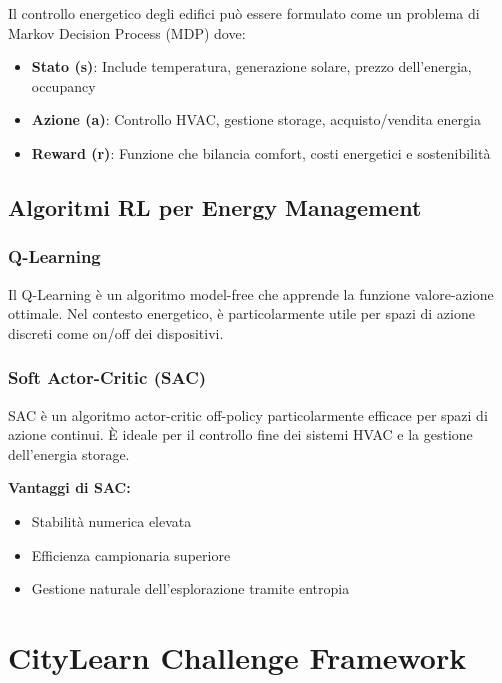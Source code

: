 \documentclass[12pt,a4paper,twoside]{report}
\begin{document}
Il controllo energetico degli edifici può essere formulato come un problema di Markov Decision Process (MDP) dove:

\begin{itemize}
    \item \textbf{Stato (s)}: Include temperatura, generazione solare, prezzo dell'energia, occupancy
    \item \textbf{Azione (a)}: Controllo HVAC, gestione storage, acquisto/vendita energia
    \item \textbf{Reward (r)}: Funzione che bilancia comfort, costi energetici e sostenibilità
\end{itemize}

\subsection{Algoritmi RL per Energy Management}

\subsubsection{Q-Learning}

Il Q-Learning \cite{watkins1992q} è un algoritmo model-free che apprende la funzione valore-azione ottimale. Nel contesto energetico, è particolarmente utile per spazi di azione discreti come on/off dei dispositivi.

\subsubsection{Soft Actor-Critic (SAC)}

SAC \cite{haarnoja2018sac} è un algoritmo actor-critic off-policy particolarmente efficace per spazi di azione continui. È ideale per il controllo fine dei sistemi HVAC e la gestione dell'energia storage.

\textbf{Vantaggi di SAC:}
\begin{itemize}
    \item Stabilità numerica elevata
    \item Efficienza campionaria superiore
    \item Gestione naturale dell'esplorazione tramite entropia
\end{itemize}

\section{CityLearn Challenge Framework}
\end{document}
